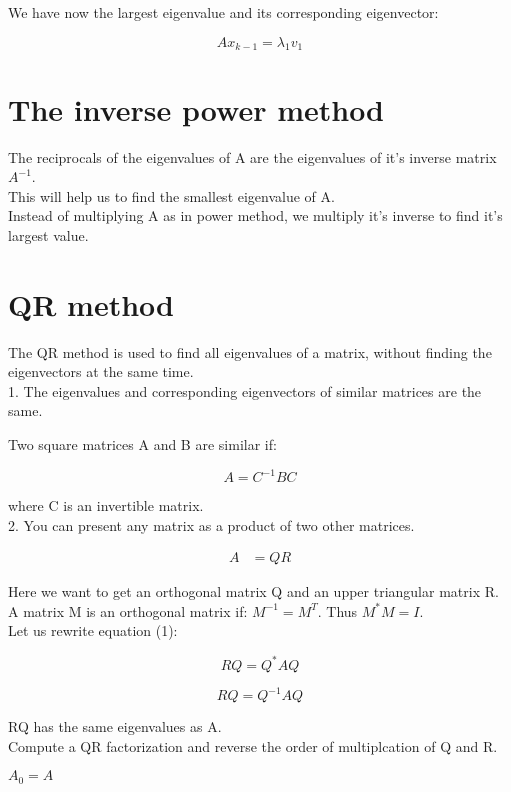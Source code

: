 \documentclass{article}
\begin{document}
We have now the largest eigenvalue and its corresponding eigenvector:

$$Ax_{k-1} = {\lambda_1}v_1$$

\section*{The inverse power method}
The reciprocals of the eigenvalues of A are the eigenvalues of it's inverse matrix  $A^{-1}$. \\
This will help us to find the smallest eigenvalue of A. \\
Instead of multiplying A as in power method, we multiply it's inverse to find it's largest value.

\section*{QR method}

The QR method is used to find all eigenvalues of a matrix, without finding the eigenvectors at the same time.\\

1. The eigenvalues and corresponding eigenvectors of similar matrices are the same.

Two square matrices A and B are similar if:

$$A = C^{-1}BC$$

where C is an invertible matrix.\\

2. You can present any matrix as a product of two other matrices. 

\begin{align}
A &= QR
\end{align}

Here we want to get an orthogonal matrix Q and an upper triangular matrix R.\\

A matrix M is an orthogonal matrix if: $M^{-1} = M^T$. Thus $M^*M = I$. \\

Let us rewrite equation (1):

$$RQ = Q^*AQ$$

$$RQ = Q^{-1}AQ$$ 

RQ has the same eigenvalues as A.\\

Compute a QR factorization and reverse the order of multiplcation of Q and R.

$A_0 = A$
\end{document}

